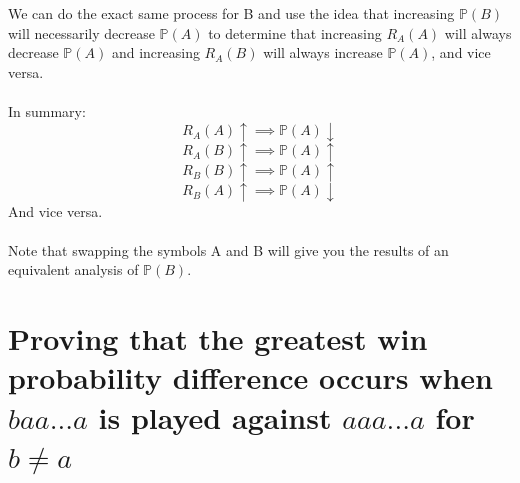 \documentclass[english,12pt,a4paper,final]{article}
\begin{document}
We can do the exact same process for B and use the idea that increasing $\mathbb{P}(B)$ will necessarily decrease $\mathbb{P}(A)$ to determine that increasing $R_A(A)$ will always decrease $\mathbb{P}(A)$ and increasing $R_A(B)$ will always increase $\mathbb{P}(A)$, and vice versa.
\\\\
In summary:
\begin{equation}\label{R_A(A)change}
	R_A(A)\uparrow \implies \mathbb{P}(A)\downarrow
\end{equation}
\begin{equation}\label{R_A(B)change}
	R_A(B)\uparrow \implies \mathbb{P}(A)\uparrow
\end{equation}
\begin{equation}\label{R_B(B)change}
	R_B(B)\uparrow \implies \mathbb{P}(A)\uparrow
\end{equation}
\begin{equation}\label{R_B(A)change}
	R_B(A)\uparrow \implies \mathbb{P}(A)\downarrow
\end{equation}
And vice versa.
\\\\

Note that swapping the symbols A and B will give you the results of an equivalent analysis of $\mathbb{P}(B)$.

\section{Proving that the greatest win probability difference occurs when $baa...a$ is played against $aaa...a$ for $b\ne a$}
\end{document}

